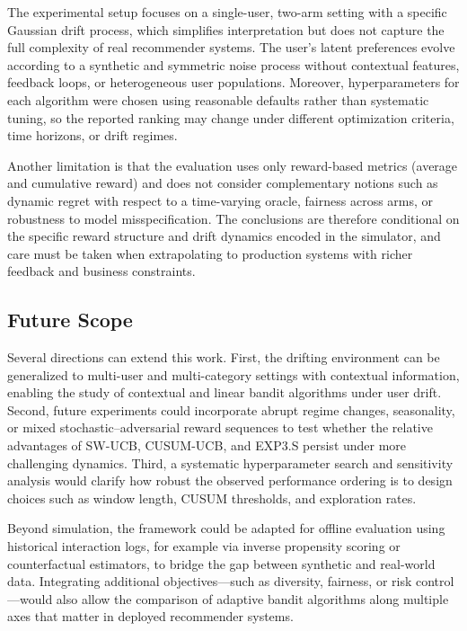 \documentclass[pdflatex,sn-mathphys-num]{sn-jnl}
\theoremstyle{thmstyleone}%
\theoremstyle{thmstyletwo}%
\theoremstyle{thmstylethree}%
\begin{document}
The experimental setup focuses on a single-user, two-arm setting with a specific
Gaussian drift process, which simplifies interpretation but does not capture the
full complexity of real recommender systems. The user’s latent preferences
evolve according to a synthetic and symmetric noise process without contextual features,
feedback loops, or heterogeneous user populations. Moreover, hyperparameters for
each algorithm were chosen using reasonable defaults rather than systematic
tuning, so the reported ranking may change under different optimization
criteria, time horizons, or drift regimes.

Another limitation is that the evaluation uses only reward-based metrics
(average and cumulative reward) and does not consider complementary notions such
as dynamic regret with respect to a time-varying oracle, fairness across arms,
or robustness to model misspecification. The conclusions are therefore
conditional on the specific reward structure and drift dynamics encoded in the
simulator, and care must be taken when extrapolating to production systems with
richer feedback and business constraints.

\subsection{Future Scope}\label{sec6-2}

Several directions can extend this work. First, the drifting environment can be
generalized to multi-user and multi-category settings with contextual
information, enabling the study of contextual and linear bandit algorithms under
user drift. Second, future experiments could incorporate abrupt regime changes,
seasonality, or mixed stochastic–adversarial reward sequences to test whether
the relative advantages of SW-UCB, CUSUM-UCB, and EXP3.S persist under more
challenging dynamics. Third, a systematic hyperparameter search and sensitivity
analysis would clarify how robust the observed performance ordering is to design
choices such as window length, CUSUM thresholds, and exploration rates.

Beyond simulation, the framework could be adapted for offline evaluation using
historical interaction logs, for example via inverse propensity scoring or
counterfactual estimators, to bridge the gap between synthetic and real-world
data. Integrating additional objectives—such as diversity, fairness, or risk
control—would also allow the comparison of adaptive bandit algorithms along
multiple axes that matter in deployed recommender systems.

\end{document}
